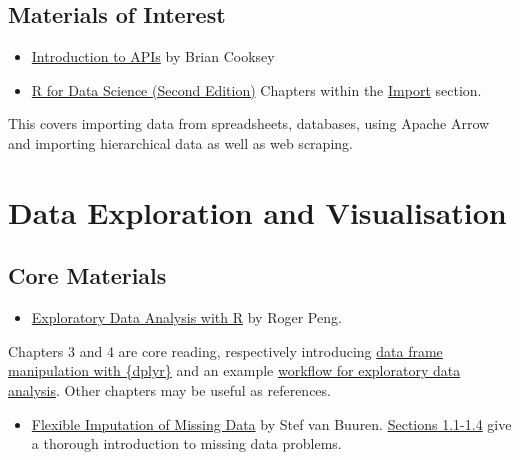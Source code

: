 \documentclass[
  12pt,
]{book}
\providecommand{\tightlist}{%
  \setlength{\itemsep}{0pt}\setlength{\parskip}{0pt}}
\begin{document}
\hypertarget{materials-of-interest-1}{%
\subsection*{Materials of Interest}\label{materials-of-interest-1}}

\begin{itemize}
\tightlist
\item
  \href{https://zapier.com/learn/apis/chapter-1-introduction-to-apis/}{Introduction to APIs} by Brian Cooksey
\item
  \href{https://r4ds.hadley.nz/}{R for Data Science (Second Edition)} Chapters within the \href{https://r4ds.hadley.nz/import.html}{Import} section.
\end{itemize}

This covers importing data from spreadsheets, databases, using Apache Arrow and importing hierarchical data as well as web scraping.

\hypertarget{edav-reading}{%
\section{Data Exploration and Visualisation}\label{edav-reading}}

\hypertarget{core-materials-2}{%
\subsection*{Core Materials}\label{core-materials-2}}

\begin{itemize}
\tightlist
\item
  \href{https://bookdown.org/rdpeng/exdata/}{Exploratory Data Analysis with R} by Roger Peng.
\end{itemize}

Chapters 3 and 4 are core reading, respectively introducing \href{https://bookdown.org/rdpeng/exdata/managing-data-frames-with-the-dplyr-package.html}{data frame manipulation with \{dplyr\}} and an example \href{https://bookdown.org/rdpeng/exdata/exploratory-data-analysis-checklist.html}{workflow for exploratory data analysis}. Other chapters may be useful as references.

\begin{itemize}
\tightlist
\item
  \href{https://stefvanbuuren.name/fimd/}{Flexible Imputation of Missing Data} by Stef van Buuren. \href{https://stefvanbuuren.name/fimd/ch-introduction.html}{Sections 1.1-1.4} give a thorough introduction to missing data problems.
\end{itemize}
\end{document}
